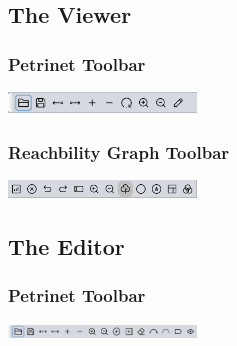 \documentclass[10pt, a4paper]{article}
\begin{document}
\subsection{The Viewer}

\subsubsection{Petrinet Toolbar}

\includegraphics[width=5cm]{Viewer_Petrinet_Toolbar.png}


\subsubsection{Reachbility Graph Toolbar}

\includegraphics[width=5cm]{Viewer_Reachability_Toolbar.png}


\subsection{The Editor}

\subsubsection{Petrinet Toolbar}

\includegraphics[width=5cm]{Editor_Toolbar.png}













 
%

%
\end{document}
